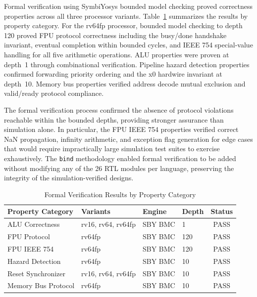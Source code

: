 \documentclass[conference]{IEEEtran}
\begin{document}
Formal verification using SymbiYosys bounded model checking proved correctness properties across all three processor variants. Table~\ref{tab:formal} summarizes the results by property category. For the rv64fp processor, bounded model checking to depth 120 proved FPU protocol correctness including the busy/done handshake invariant, eventual completion within bounded cycles, and IEEE 754 special-value handling for all five arithmetic operations. ALU properties were proven at depth~1 through combinational verification. Pipeline hazard detection properties confirmed forwarding priority ordering and the x0 hardwire invariant at depth~10. Memory bus properties verified address decode mutual exclusion and valid/ready protocol compliance.

The formal verification process confirmed the absence of protocol violations reachable within the bounded depths, providing stronger assurance than simulation alone. In particular, the FPU IEEE 754 properties verified correct NaN propagation, infinity arithmetic, and exception flag generation for edge cases that would require impractically large simulation test suites to exercise exhaustively. The \texttt{bind} methodology enabled formal verification to be added without modifying any of the 26 RTL modules per language, preserving the integrity of the simulation-verified designs.

\begin{table}[t]
  \centering
  \caption{Formal Verification Results by Property Category}
  \label{tab:formal}
  \footnotesize
  \begin{tabular}{@{}llllc@{}}
    \toprule
    Property Category & Variants & Engine & Depth & Status \\
    \midrule
    ALU Correctness     & rv16, rv64, rv64fp & SBY BMC & 1   & PASS \\
    FPU Protocol        & rv64fp             & SBY BMC & 120 & PASS \\
    FPU IEEE 754        & rv64fp             & SBY BMC & 120 & PASS \\
    Hazard Detection    & rv64fp             & SBY BMC & 10  & PASS \\
    Reset Synchronizer  & rv16, rv64, rv64fp & SBY BMC & 10  & PASS \\
    Memory Bus Protocol & rv64fp             & SBY BMC & 10  & PASS \\
    \bottomrule
  \end{tabular}
\end{table}
\end{document}
